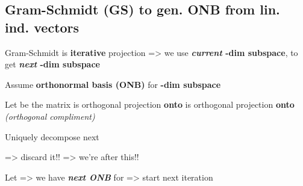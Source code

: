 \subsection*{Gram-Schmidt (GS) to gen. ONB from lin. ind. vectors}
\begin{itemize}

      \vItem
            Gram-Schmidt is \textbf{iterative} projection => we use
            \textbf{\emph{current} -dim subspace}, to get
            \textbf{\emph{next} -dim subspace}

            \begin{itemize}

                  \vItem
                        Assume \textbf{orthonormal basis (ONB)}
                        for \textbf{-dim subspace
                              }

                        \begin{itemize}

                              \vItem
                                    Let
                                    be the matrix
                              \vItem
                                     is orthogonal projection \textbf{onto
                                          }
                              \vItem
                                    is orthogonal projection \textbf{onto
                                          } \emph{(orthogonal
                                          compliment)}
                        \end{itemize}
                  \vItem
                        Uniquely decompose next 
                        \begin{itemize}

                              \vItem
                                    => discard it!!
                              \vItem
                                    => we're after this!!
                        \end{itemize}
                  \vItem
                        Let 
                        => we have \textbf{\emph{next ONB}}
                         for
                         => start next iteration


\end{itemize}
\end{itemize}

